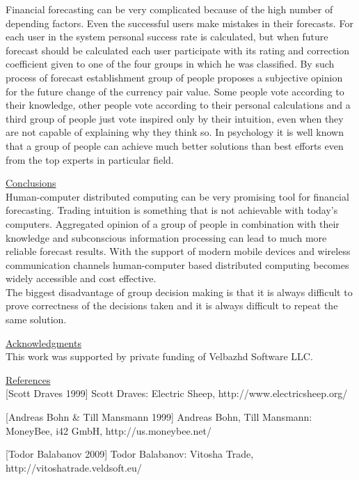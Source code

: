 \documentclass{article}
\begin{document}
Financial forecasting can be very complicated because of the high number of depending factors. Even the successful users make mistakes in their forecasts. For each user in the system personal success rate is calculated, but when future forecast should be calculated each user participate with its rating and correction coefficient given to one of the four groups in which he was classified. By such process of forecast establishment group of people proposes a subjective opinion for the future change of the currency pair value. Some people vote according to their knowledge, other people vote according to their personal calculations and a third group of people just vote inspired only by their intuition, even when they are not capable of explaining why they think so. In psychology it is well known that a group of people can achieve much better solutions than best efforts even from the top experts in particular field. 

\vspace*{3mm}
\underline{Conclusions} \\

Human-computer distributed computing can be very promising tool for financial forecasting. Trading intuition is something that is not achievable with today's computers. Aggregated opinion of a group of people in combination with their knowledge and subconscious information processing can lead to much more reliable forecast results. With the support of modern mobile devices and wireless communication channels human-computer based distributed computing becomes widely accessible and cost effective. \\

The biggest disadvantage of group decision making is that it is always difficult to prove correctness of the decisions taken and it is always difficult to repeat the same solution. 

\vspace*{3mm}
\underline{Acknowledgments} \\

This work was supported by private funding of Velbazhd Software LLC.

\vspace*{3mm}
\underline{References} \\

[Scott Draves 1999] Scott Draves: Electric Sheep, http://www.electricsheep.org/
\vspace*{2mm}

[Andreas Bohn \& Till Mansmann 1999] Andreas Bohn, Till Mansmann: MoneyBee, i42 GmbH, http://us.moneybee.net/
\vspace*{2mm}

[Todor Balabanov 2009] Todor Balabanov: Vitosha Trade, http://vitoshatrade.veldsoft.eu/
\vspace*{2mm}
\end{document}
